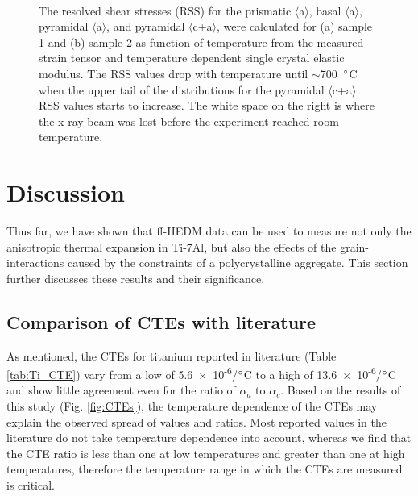 \documentclass[3p]{elsarticle}
\begin{document}
	\begin{figure}[h!]
	\centering
	\hspace{5pt}
	\\

	
	\caption{The resolved shear stresses (RSS) for the prismatic $\langle$a$\rangle$, basal $\langle$a$\rangle$, pyramidal $\langle$a$\rangle$, and pyramidal $\langle$c+a$\rangle$, were calculated for (a) sample 1 and (b) sample 2 as function of temperature from the measured strain tensor and temperature dependent single crystal elastic modulus. The RSS values drop with temperature until $\sim$700~$\degree$C when the upper tail of the distributions for the pyramidal $\langle$c+a$\rangle$ RSS values starts to increase. The white space on the right is where the x-ray beam was lost before the experiment reached room temperature.}
	\label{fig:RSS}
\end{figure}



\section{Discussion} \label{sec:discussion}
	Thus far, we have shown that f{}f-HEDM data can be used to measure not only the anisotropic thermal expansion in Ti-7Al, but also the ef{}fects of the grain-interactions caused by the constraints of a polycrystalline aggregate. This section further discusses these results and their significance.

\subsection{Comparison of CTEs with literature}
	As mentioned, the CTEs for titanium reported in literature (Table \ref{tab:Ti_CTE}) vary from a low of 5.6~$\times$~10\textsuperscript{-6}/$\degree$C to a high of 13.6~$\times$~10\textsuperscript{-6}/$\degree$C and show little agreement even for the ratio of $\alpha_a$ to $\alpha_c$. Based on the results of this study (Fig. \ref{fig:CTEs}), the temperature dependence of the CTEs may explain the observed spread of values and ratios. Most reported values in the literature do not take temperature dependence into account, whereas we find that the CTE ratio is less than one at low temperatures and greater than one at high temperatures, therefore the temperature range in which the CTEs are measured is critical.
\end{document}

